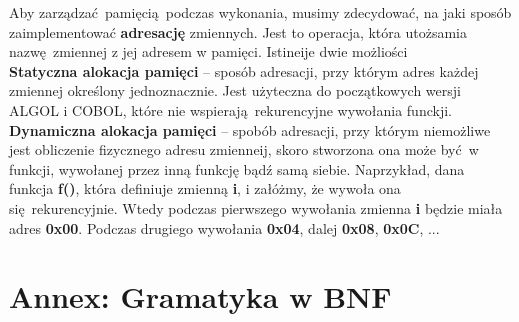 \documentclass[leqno, 12pt]{article}
\begin{document}
		Aby zarządzać pamięcią podczas wykonania, musimy zdecydować, na jaki sposób zaimplementować
		\textbf{adresację} zmiennych. Jest to operacja, która utożsamia nazwę zmiennej z jej adresem w pamięci.
		Istineije dwie możliości
		\\
		
		\textbf{Statyczna alokacja pamięci} -- sposób adresacji, przy którym adres każdej zmiennej określony
		jednoznacznie. Jest użyteczna do początkowych wersji ALGOL i COBOL, które nie wspierają rekurencyjne
		wywołania funckji.
		\\
		
		\textbf{Dynamiczna alokacja pamięci} -- spobób adresacji, przy którym niemożliwe jest obliczenie
		fizycznego adresu zmienneij, skoro stworzona ona może być w funkcji, wywołanej przez inną funkcję
		bądź samą siebie. Naprzykład, dana funkcja \textbf{f()}, która definiuje zmienną \textbf{i}, i
		załóżmy, że wywoła ona się rekurencyjnie. Wtedy podczas pierwszego wywołania zmienna \textbf{i}
		będzie miała adres \textbf{0x00}. Podczas drugiego wywołania \textbf{0x04}, dalej \textbf{0x08},
		\textbf{0x0C}, ...

		\newpage

	\section{Annex: Gramatyka w BNF}

        \setlength{\grammarindent}{12em}
\end{document}
